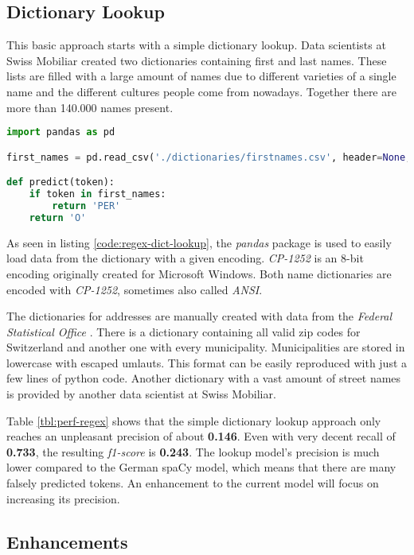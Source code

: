 \subsection{Dictionary Lookup}

This basic approach starts with a simple dictionary lookup. Data scientists at Swiss Mobiliar created two dictionaries containing first and last names. These lists are filled with a large amount of names due to different varieties of a single name and the different cultures people come from nowadays. Together there are more than 140.000 names present.

\begin{lstlisting}[language=Python, label={code:regex-dict-lookup}, caption=Simple dictionary lookup]
import pandas as pd

first_names = pd.read_csv('./dictionaries/firstnames.csv', header=None, encoding='cp1252')[0]

def predict(token):
    if token in first_names:
        return 'PER'
    return 'O'
\end{lstlisting}

As seen in listing \ref{code:regex-dict-lookup}, the \emph{pandas} package is used to easily load data from the dictionary with a given encoding. \emph{CP-1252} is an 8-bit encoding originally created for Microsoft Windows. Both name dictionaries are encoded with \emph{CP-1252}, sometimes also called \emph{ANSI}.

The dictionaries for addresses are manually created with data from the \emph{Federal Statistical Office} \cite{bfs}. There is a dictionary containing all valid zip codes for Switzerland and another one with every municipality. Municipalities are stored in lowercase with escaped umlauts. This format can be easily reproduced with just a few lines of python code. Another dictionary with a vast amount of street names is provided by another data scientist at Swiss Mobiliar.

Table \ref{tbl:perf-regex} shows that the simple dictionary lookup approach only reaches an unpleasant precision of about \textbf{0.146}. Even with very decent recall of \textbf{0.733}, the resulting \emph{f1-score} is \textbf{0.243}. The lookup model's precision is much lower compared to the German spaCy model, which means that there are many falsely predicted tokens. An enhancement to the current model will focus on increasing its precision.

\subsection{Enhancements}

